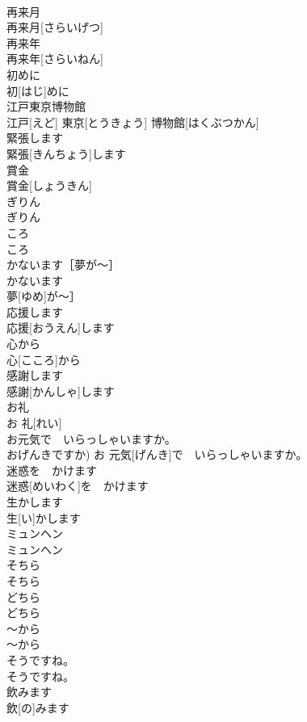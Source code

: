 \documentclass[8pt]{extreport}
\begin{document}
\begin{CJK}{UTF8}{min}
\\	再来月	
\\	再来月[さらいげつ]	
\\	再来年	
\\	再来年[さらいねん]	
\\	初めに	
\\	初[はじ]めに	
\\	江戸東京博物館	
\\	江戸[えど] 東京[とうきょう] 博物館[はくぶつかん]	
\\	緊張します	
\\	緊張[きんちょう]します	
\\	賞金	
\\	賞金[しょうきん]	
\\	ぎりん	
\\	ぎりん	
\\	ころ	
\\	ころ	
\\	かないます［夢が〜］	
\\	かないます
\\	夢[ゆめ]が〜］	
\\	応援します	
\\	応援[おうえん]します	
\\	心から	
\\	心[こころ]から	
\\	感謝します	
\\	感謝[かんしゃ]します	
\\	お礼	
\\	お 礼[れい]	
\\	お元気で　いらっしゃいますか。	
\\	おげんきですか)	お 元気[げんき]で　いらっしゃいますか。	
\\	迷惑を　かけます	
\\	迷惑[めいわく]を　かけます	
\\	生かします	
\\	生[い]かします	
\\	ミュンヘン	
\\	ミュンヘン	
\\	そちら	
\\	そちら	
\\	どちら	
\\	どちら	
\\	〜から	
\\	〜から	
\\	そうですね。	
\\	そうですね。	
\\	飲みます	
\\	飲[の]みます	

\end{CJK}
\end{document}
